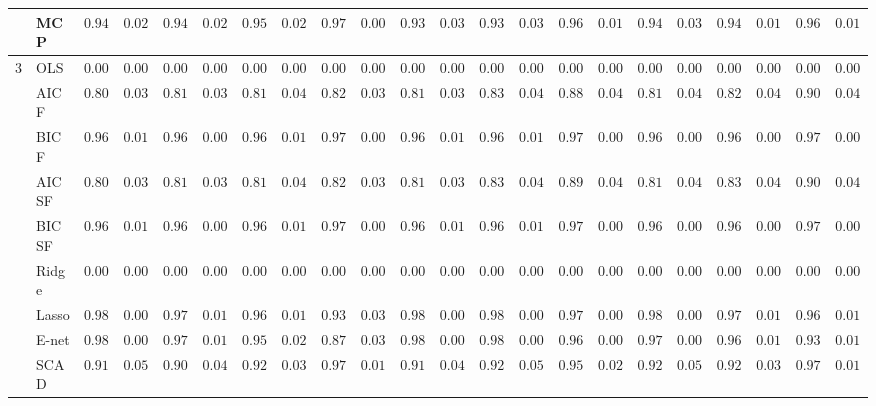 \begin{tabular}{p{0.2cm}p{1cm}|p{0.6cm}p{0.6cm}|p{0.6cm}p{0.6cm}p{0.6cm}p{0.6cm}p{0.6cm}p{0.6cm}|p{0.6cm}p{0.6cm}p{0.6cm}p{0.6cm}p{0.6cm}p{0.6cm}|p{0.6cm}p{0.6cm}p{0.6cm}p{0.6cm}p{0.6cm}p{0.6cm}}
 & MCP  & $0.9412$ & $0.0276$ & $0.9423$ & $0.0295$ & $0.9514$ & $0.0209$ & $0.9727$ & $0.0085$ & $0.9399$ & $0.0312$ & $0.9364$ & $0.0325$ & $0.9649$ & $0.0158$ & $0.9436$ & $0.0345$ & $0.9436$ & $0.0195$ & $0.9626$ & $0.0174$ \\\hline
3 & OLS  & $0.0000$ & $0.0000$ & $0.0000$ & $0.0000$ & $0.0000$ & $0.0000$ & $0.0000$ & $0.0000$ & $0.0000$ & $0.0000$ & $0.0000$ & $0.0000$ & $0.0000$ & $0.0000$ & $0.0000$ & $0.0000$ & $0.0000$ & $0.0000$ & $0.0000$ & $0.0000$ \\
 & AIC F  & $0.8044$ & $0.0392$ & $0.8121$ & $0.0388$ & $0.8123$ & $0.0415$ & $0.8241$ & $0.0338$ & $0.8115$ & $0.0379$ & $0.8305$ & $0.0417$ & $0.8878$ & $0.0427$ & $0.8112$ & $0.0434$ & $0.8280$ & $0.0443$ & $0.9041$ & $0.0459$ \\
 & BIC F  & $0.9619$ & $0.0117$ & $0.9623$ & $0.0085$ & $0.9624$ & $0.0113$ & $0.9760$ & $0.0075$ & $0.9614$ & $0.0106$ & $0.9657$ & $0.0118$ & $0.9769$ & $0.0066$ & $0.9636$ & $0.0092$ & $0.9665$ & $0.0094$ & $0.9793$ & $0.0072$ \\
 & AIC SF  & $0.8051$ & $0.0388$ & $0.8135$ & $0.0387$ & $0.8128$ & $0.0419$ & $0.8242$ & $0.0338$ & $0.8119$ & $0.0377$ & $0.8327$ & $0.0404$ & $0.8911$ & $0.0416$ & $0.8123$ & $0.0427$ & $0.8304$ & $0.0429$ & $0.9047$ & $0.0448$ \\
 & BIC SF  & $0.9619$ & $0.0117$ & $0.9623$ & $0.0085$ & $0.9625$ & $0.0112$ & $0.9760$ & $0.0075$ & $0.9614$ & $0.0106$ & $0.9657$ & $0.0118$ & $0.9769$ & $0.0066$ & $0.9636$ & $0.0092$ & $0.9665$ & $0.0094$ & $0.9793$ & $0.0072$ \\
 & Ridge  & $0.0000$ & $0.0000$ & $0.0000$ & $0.0000$ & $0.0000$ & $0.0000$ & $0.0000$ & $0.0000$ & $0.0000$ & $0.0000$ & $0.0000$ & $0.0000$ & $0.0000$ & $0.0000$ & $0.0000$ & $0.0000$ & $0.0000$ & $0.0000$ & $0.0000$ & $0.0000$ \\
 & Lasso  & $0.9865$ & $0.0062$ & $0.9793$ & $0.0118$ & $0.9667$ & $0.0184$ & $0.9361$ & $0.0307$ & $0.9862$ & $0.0059$ & $0.9833$ & $0.0089$ & $0.9755$ & $0.0094$ & $0.9806$ & $0.0080$ & $0.9733$ & $0.0104$ & $0.9634$ & $0.0148$ \\
 & E-net  & $0.9860$ & $0.0065$ & $0.9765$ & $0.0136$ & $0.9548$ & $0.0262$ & $0.8768$ & $0.0311$ & $0.9852$ & $0.0070$ & $0.9809$ & $0.0095$ & $0.9696$ & $0.0079$ & $0.9792$ & $0.0082$ & $0.9685$ & $0.0121$ & $0.9320$ & $0.0173$ \\
 & SCAD  & $0.9144$ & $0.0504$ & $0.9076$ & $0.0451$ & $0.9238$ & $0.0327$ & $0.9785$ & $0.0107$ & $0.9138$ & $0.0485$ & $0.9244$ & $0.0516$ & $0.9544$ & $0.0288$ & $0.9228$ & $0.0506$ & $0.9272$ & $0.0323$ & $0.9702$ & $0.0196$ \\

\end{tabular}
